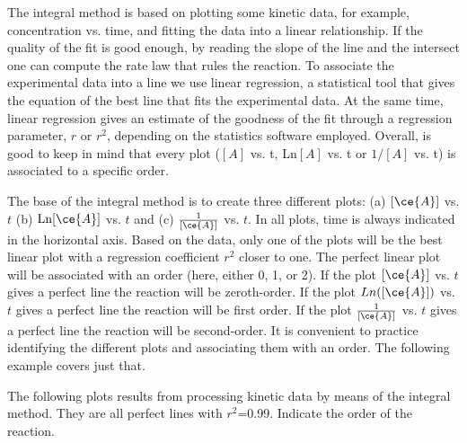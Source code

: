 \documentclass[main.tex]{subfiles}
\begin{document}
\begin{description}
The integral method is based on plotting some kinetic data, for example, concentration vs. time, and fitting the data into a linear relationship.
If the quality of the fit is good enough, by reading the slope of the line and the intersect one can compute the rate law that rules the reaction.
To associate the experimental data into a line we use linear regression, a statistical tool that gives the equation of the best line that fits the experimental data. At the same time, linear regression gives an estimate of the goodness of the fit through a regression parameter, $r$ or $r^2$, depending on the statistics software employed.
Overall, is good to keep in mind that every plot ($[A]$ vs. t, Ln$[A]$ vs. t or $1/[A]$ vs. t) is associated to a specific order.  
\item[\docfilehook{The integral method: associating a linear plot with an order}{}] 
The base of the integral method is to create three different plots: (a) $[\ce{A}]$ vs. $t$ (b) $\text{Ln}[\ce{A}]$ vs. $t$ and (c) $\frac{1}{[\ce{A}]}$ vs. $t$. In all plots, time is always indicated in the horizontal axis. Based on the data, only one of the plots will be the best linear plot with a  regression coefficient $r^2$ closer to one. The perfect linear plot will be associated with an order (here, either 0, 1, or 2). If the plot $[\ce{A}]$ vs. $t$ gives a perfect line the reaction will be zeroth-order. If the plot $Ln([\ce{A}])$ vs. $t$ gives a perfect line the reaction will be first order. If the plot $\frac{1}{[\ce{A}]}$ vs. $t$ gives a perfect line the reaction will be second-order. It is convenient to practice identifying the different plots and associating them with an order. The following example covers just that.
\begin{example} %
The following plots results from processing kinetic data by means of the integral method. They are all perfect lines with $r^2$=0.99. Indicate the order of the reaction.
\begin{center}
\end{center}
\end{example}
\end{description}
\end{document}
